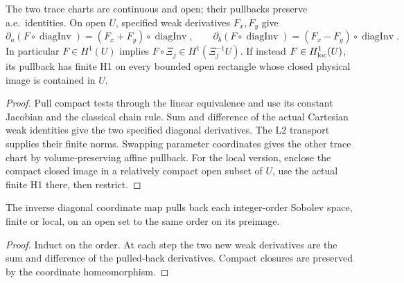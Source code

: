 \begin{lemma}
\label{lem:diagonal-h1-pullback}
\leanok
The two trace charts are continuous and open; their pullbacks preserve a.e.\
identities. On open $U$, specified weak derivatives $F_x,F_y$ give
\[
 \partial_a(F\circ\operatorname{diagInv})=(F_x+F_y)\circ\operatorname{diagInv},
 \qquad
 \partial_b(F\circ\operatorname{diagInv})=(F_x-F_y)\circ\operatorname{diagInv}.
\]
In particular $F\in H^1(U)$ implies $F\circ\Xi_j\in H^1(\Xi_j^{-1}U)$.
If instead $F\in H^1_{\rm loc}(U)$, its pullback has finite H1 on every
bounded open rectangle whose closed physical image is contained in $U$.
\end{lemma}

\begin{proof}
\leanok
Pull compact tests through the linear equivalence and use its constant
Jacobian and the classical chain rule. Sum and difference of the actual
Cartesian weak identities give the two specified diagonal derivatives.
The L2 transport supplies their finite norms. Swapping parameter coordinates
gives the other trace chart by volume-preserving affine pullback.
For the local version, enclose the compact closed image in a relatively
compact open subset of $U$, use the actual finite H1 there, then restrict.
\end{proof}

\begin{lemma}
\label{lem:diagonal-sobolev-pullback}
\leanok
The inverse diagonal coordinate map pulls back each integer-order Sobolev
space, finite or local, on an open set to the same order on its preimage.
\end{lemma}

\begin{proof}
\leanok
Induct on the order. At each step the two new weak derivatives are the sum
and difference of the pulled-back derivatives. Compact closures are
preserved by the coordinate homeomorphism.
\end{proof}

